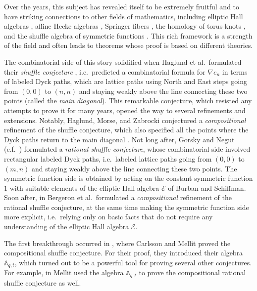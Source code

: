 \documentclass[reqno]{amsart}
\theoremstyle{plain}
\theoremstyle{definition}
\theoremstyle{remark}
\newcommand{\A}{\mathbb{A}}%
\newcommand{\<}{\langle}
\renewcommand{\>}{\rangle}
\begin{document}
Over the years, this subject has revealed itself to be extremely fruitful and to have striking connections to other fields of mathematics, including elliptic Hall algebras \cites{SchiffmannVasserot2011EllipticHallAlgebra,BHMPS2023ShuffleAnyLine}, affine Hecke algebras \cite{CarlssonMellit2018ShuffleConjecture}, Springer fibers \cite{Mellit2020SpringerFibers}, the homology of torus knots \cites{GorskyNegut2015RefinedKnotInvariants, Mellit2022HomologyTorusKnots}, and the shuffle algebra of symmetric functions \cite{Negut2014ShuffleAlgebra}. This rich framework is a strength of the field and often leads to theorems whose proof is based on different theories.

The combinatorial side of this story solidified when Haglund et al.\ formulated their \emph{shuffle conjecture}  \cite{HaglundHaimanLoehrRemmelUlyanov2005ShuffleConjecture}, i.e.\ predicted a combinatorial formula for $\nabla e_n$ in terms of labeled Dyck paths, which are lattice paths using North and East steps going from $(0,0)$ to $(n,n)$ and staying weakly above the line connecting these two points (called the \emph{main diagonal}). This remarkable conjecture, which resisted any attempts to prove it for many years, opened the way to several refinements and extensions. Notably, Haglund, Morse, and Zabrocki conjectured a \emph{compositional} refinement of the shuffle conjecture, which also specified all the points where the Dyck paths return to the main diagonal \cite{HaglundMorseZabrocki2012CompositionalShuffleConjecture}. Not long after, Gorsky and Negut (c.f.\ \cites{GorskyNegut2015RefinedKnotInvariants,Negut2014ShuffleAlgebra}) formulated a \emph{rational shuffle conjecture}, whose combinatorial side involved rectangular labeled Dyck paths, i.e.\ labeled lattice paths going from $(0,0)$ to $(m,n)$ and staying weakly above the line connecting these two points. The symmetric function side is obtained by acting on the constant symmetric function $1$ with suitable elements of the elliptic Hall algebra $\mathcal{E}$ of Burban and Schiffman. Soon after, in \cite{BergeronGarsiaSergelXin2015CompositionalShuffleConjectures} Bergeron et al.\ formulated a \emph{compositional} refinement of the rational shuffle conjecture, at the same time making the symmetric function side more explicit, i.e.\ relying only on basic facts that do not require any understanding of the elliptic Hall algebra $\mathcal{E}$. 

The first breakthrough occurred in \cite{CarlssonMellit2018ShuffleConjecture}, where Carlsson and Mellit proved the compositional shuffle conjecture. For their proof, they introduced their algebra $\A_{q,t}$, which turned out to be a powerful tool for proving several other conjectures. For example, in \cite{Mellit2021Rational} Mellit used the algebra $\A_{q,t}$ to prove the compositional rational shuffle conjecture as well.
\end{document}
